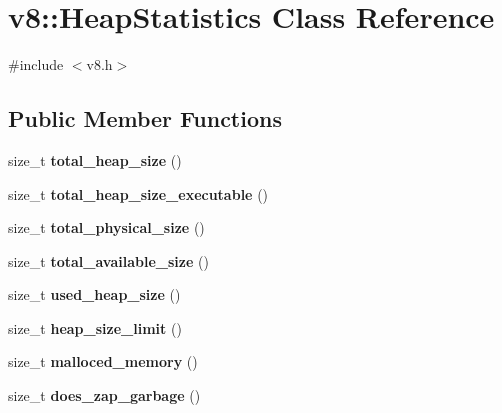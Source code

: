 \hypertarget{classv8_1_1_heap_statistics}{}\section{v8\+:\+:Heap\+Statistics Class Reference}
\label{classv8_1_1_heap_statistics}


{\ttfamily \#include $<$v8.\+h$>$}

\subsection*{Public Member Functions}
\begin{DoxyCompactItemize}
\item 
size\+\_\+t {\bfseries total\+\_\+heap\+\_\+size} ()\hypertarget{classv8_1_1_heap_statistics_ac005b9c55d5818b6969c8fd61359139b}{}\label{classv8_1_1_heap_statistics_ac005b9c55d5818b6969c8fd61359139b}

\item 
size\+\_\+t {\bfseries total\+\_\+heap\+\_\+size\+\_\+executable} ()\hypertarget{classv8_1_1_heap_statistics_aa935ea51c12ec64049c06b532dbb4f8d}{}\label{classv8_1_1_heap_statistics_aa935ea51c12ec64049c06b532dbb4f8d}

\item 
size\+\_\+t {\bfseries total\+\_\+physical\+\_\+size} ()\hypertarget{classv8_1_1_heap_statistics_a084994a3a5edf15b73c9b171a911a487}{}\label{classv8_1_1_heap_statistics_a084994a3a5edf15b73c9b171a911a487}

\item 
size\+\_\+t {\bfseries total\+\_\+available\+\_\+size} ()\hypertarget{classv8_1_1_heap_statistics_aa6df7f6e60766279cf4d8447a6d4d14d}{}\label{classv8_1_1_heap_statistics_aa6df7f6e60766279cf4d8447a6d4d14d}

\item 
size\+\_\+t {\bfseries used\+\_\+heap\+\_\+size} ()\hypertarget{classv8_1_1_heap_statistics_a05ecb48bceea49d2fe430c81df02babc}{}\label{classv8_1_1_heap_statistics_a05ecb48bceea49d2fe430c81df02babc}

\item 
size\+\_\+t {\bfseries heap\+\_\+size\+\_\+limit} ()\hypertarget{classv8_1_1_heap_statistics_a27e5a1ba9bc8530c6bf1cf277ce3d179}{}\label{classv8_1_1_heap_statistics_a27e5a1ba9bc8530c6bf1cf277ce3d179}

\item 
size\+\_\+t {\bfseries malloced\+\_\+memory} ()\hypertarget{classv8_1_1_heap_statistics_a288dcfe7dba458223d02788471990060}{}\label{classv8_1_1_heap_statistics_a288dcfe7dba458223d02788471990060}

\item 
size\+\_\+t {\bfseries does\+\_\+zap\+\_\+garbage} ()\hypertarget{classv8_1_1_heap_statistics_a459f7892a7d56747302e8e9a688debad}{}\label{classv8_1_1_heap_statistics_a459f7892a7d56747302e8e9a688debad}

\end{DoxyCompactItemize}
